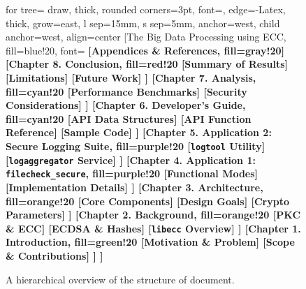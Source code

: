 \begin{figure}[h!]
	\centering
	\begin{adjustbox}{max width=\textwidth}
		\begin{forest}
			for tree={
				draw,
				thick,
				rounded corners=3pt,
				font=\sffamily,
				edge={-Latex, thick},
				grow=east,         %
				l sep=15mm,         %
				s sep=5mm,          %
				anchor=west,
				child anchor=west,
				align=center        %
			}
			[The Big Data Processing using ECC, fill=blue!20, font=\sffamily\bfseries
			[Appendices \& References, fill=gray!20]
			[Chapter 8. Conclusion, fill=red!20
			[Summary of Results]
			[Limitations]
			[Future Work]
			]
			[Chapter 7. Analysis, fill=cyan!20
			[Performance Benchmarks]
			[Security Considerations]
			]
			[Chapter 6. Developer's Guide, fill=cyan!20
			[API Data Structures]
			[API Function Reference]
			[Sample Code]
			]
			[Chapter 5. Application 2: Secure Logging Suite, fill=purple!20
			[\texttt{logtool} Utility]
			[\texttt{logaggregator} Service]
			]
			[Chapter 4. Application 1: \texttt{filecheck\_secure}, fill=purple!20
			[Functional Modes]
			[Implementation Details]
			]
			[Chapter 3. Architecture, fill=orange!20
			[Core Components]
			[Design Goals]
			[Crypto Parameters]
			]
			[Chapter 2. Background, fill=orange!20
			[PKC \& ECC]
			[ECDSA \& Hashes]
			[\texttt{libecc} Overview]
			]
			[Chapter 1. Introduction, fill=green!20
			[Motivation \& Problem]
			[Scope \& Contributions]
			]
			]
		\end{forest}
	\end{adjustbox}
	\caption{A hierarchical overview of the structure of document.}
	\label{fig:report_structure_full}
\end{figure}